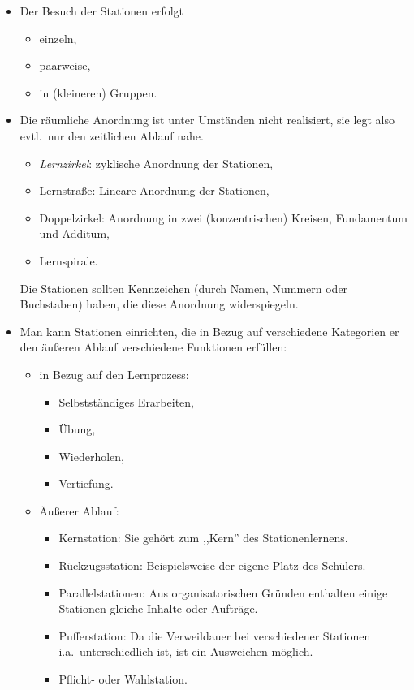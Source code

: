 \begin{itemize}
\item Der Besuch der Stationen erfolgt
\begin{itemize}
\item einzeln,
\item paarweise,
\item in (kleineren) Gruppen.
\end{itemize}

\item Die r\"{a}umliche Anordnung ist unter Umst\"{a}nden nicht realisiert, sie legt also evtl.\ nur den
zeitlichen Ablauf nahe.
\begin{itemize}
\item \emph{Lernzirkel}: zyklische Anordnung der Stationen,
\item Lernstra{\ss}e: Lineare Anordnung der Stationen,
\item Doppelzirkel: Anordnung in zwei (konzentrischen) Kreisen, Fundamentum und Additum,
\item Lernspirale.
\end{itemize}

Die Stationen sollten Kennzeichen (durch Namen, Nummern oder Buchstaben) haben, die diese Anordnung widerspiegeln.

\item Man kann Stationen einrichten, die in Bezug auf verschiedene Kategorien er den \"{a}u{\ss}eren Ablauf verschiedene
Funktionen erf\"{u}llen:
\begin{itemize}
\item in Bezug auf den Lernprozess:
\begin{itemize}
\item Selbstst\"{a}ndiges Erarbeiten,
\item \"{U}bung,
\item Wiederholen,
\item Vertiefung.
\end{itemize}

\item \"{A}u{\ss}erer Ablauf:
\begin{itemize}
\item Kernstation: Sie geh\"{o}rt zum ,,Kern'' des Stationenlernens.
\item R\"{u}ckzugsstation: Beispielsweise der eigene Platz des Sch\"{u}lers.
\item Parallelstationen: Aus organisatorischen Gr\"{u}nden enthalten einige Stationen gleiche Inhalte oder Auftr\"{a}ge.
\item Pufferstation: Da die Verweildauer bei verschiedener Stationen i.a.\ unterschiedlich ist, ist
ein Ausweichen m\"{o}glich.
\item Pflicht- oder Wahlstation.
\end{itemize}


\end{itemize}
\end{itemize}
